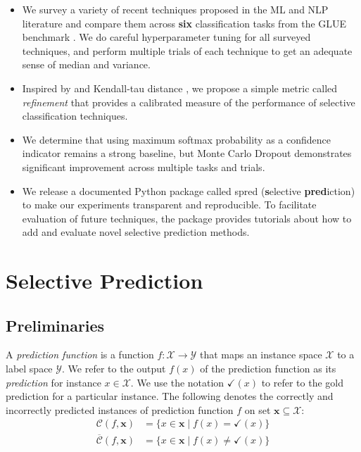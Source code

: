 \documentclass[11pt]{article}
\begin{document}
\begin{itemize}
	\item We survey a variety of recent techniques proposed in the ML and NLP literature and compare them across \textbf{six} classification tasks from the \textsc{GLUE} benchmark \cite{wang-etal-2018-glue}. We do careful hyperparameter tuning for all surveyed techniques, and perform multiple trials of each technique to get an adequate sense of median and variance.
	\item Inspired by \cite{xin-etal-2021-art} and Kendall-tau distance \cite{kendall1948rank}, we propose a simple metric called \emph{refinement} that provides a calibrated measure of the performance of selective classification techniques.
	\item We determine that using maximum softmax probability as a confidence indicator remains a strong baseline, but Monte Carlo Dropout \cite{gal2016dropout} demonstrates significant improvement across multiple tasks and trials.
	\item We release a documented Python package called \textsf{spred} (\textbf{s}elective \textbf{pred}iction) to make our experiments transparent and reproducible. To facilitate evaluation of future techniques, the package provides tutorials about how to add and evaluate novel selective prediction methods.
\end{itemize}

\section{Selective Prediction}

\subsection{Preliminaries}

A \emph{prediction function} is a function $f: \mathcal{X} \rightarrow \mathcal{Y}$ that maps an instance space $\mathcal{X}$ to a label space $\mathcal{Y}$. We refer to the output $f(x)$ of the prediction function as its \emph{prediction} for instance $x \in \mathcal{X}$. We use the notation $\checkmark(x)$ to refer to the gold prediction for a particular instance. The following denotes the correctly and incorrectly predicted instances of prediction function $f$ on set $\mathbf{x} \subseteq \mathcal{X}$:
\begin{eqnarray*}
\mathcal{C}(f,\mathbf{x})
&= \{ x \in \mathbf{x} \mid f(x) = \checkmark(x) \} \\
\overline{\mathcal{C}}(f,\mathbf{x})
&= \{ x \in \mathbf{x} \mid f(x) \neq \checkmark(x) \}
\end{eqnarray*}
\end{document}
